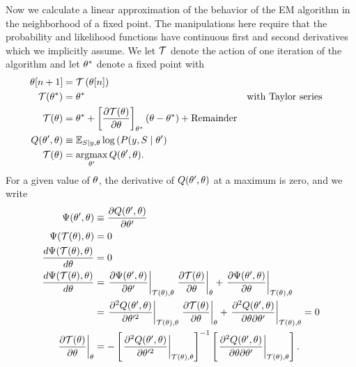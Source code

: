 \newcommand{\OldParameters}{\parameters}
\newcommand{\NewParameters}{\parameters'}
Now we calculate a linear approximation of the behavior of the EM
algorithm in the neighborhood of a fixed point.  The manipulations
here require that the probability and likelihood functions have
continuous first and second derivatives which we implicitly assume.
We let $\EMmap$ denote the action of one iteration of the algorithm and
let ${\theta^*}$ denote a fixed point with
\begin{align}
  \ti{\parameters}{n+1} &= \EMmap\left( \ti{\parameters}{n} \right) \\
  \EMmap(\EMfixedPoint) &= \EMfixedPoint && \text{with Taylor series} \\
  \EMmap(\parameters) &= \EMfixedPoint + \left[ \frac{\partial
                 \EMmap(\parameters)}{\partial \parameters} \right]_{\EMfixedPoint} (\parameters - \EMfixedPoint) + \text{Remainder} \\
  Q(\NewParameters, \OldParameters) &\equiv \EV_{S \given y,\OldParameters} \log\left(P(y,S \given
  \NewParameters \right) \\
  \EMmap(\OldParameters) &= \argmax_{\NewParameters} Q(\NewParameters, \OldParameters). 
\end{align}
For a given value of $\OldParameters$, the derivative of $Q(\NewParameters,
\OldParameters)$ at a maximum is zero, and we write
\begin{align}
  \Psi(\NewParameters,\OldParameters)
  &\equiv \frac{\partial Q(\NewParameters,
    \OldParameters)}{\partial \NewParameters} \\
  \Psi(\EMmap(\OldParameters), \OldParameters)
  &= 0 \\
  \frac{d\Psi(\EMmap(\OldParameters), \OldParameters)}{d \OldParameters}
  &= 0 \\
  \frac{d\Psi(\EMmap(\OldParameters), \OldParameters)}{d \OldParameters}
  &= \left. \frac{\partial \Psi(\NewParameters, \OldParameters)}{\partial \NewParameters}
    \right|_{\EMmap(\OldParameters), \OldParameters} \left.\frac{\partial
    \EMmap(\theta)}{\partial \theta} \right|_{\OldParameters} +
    \left. \frac{\partial \Psi(\NewParameters, \OldParameters)}{\partial \OldParameters}
    \right|_{\EMmap(\OldParameters), \OldParameters} \\
  &= \left. \frac{\partial^2 Q(\NewParameters, \OldParameters)}{\partial \NewParameters^2}
    \right|_{\EMmap(\OldParameters), \OldParameters} \left.\frac{\partial
    \EMmap(\theta)}{\partial \theta} \right|_{\OldParameters} +
    \left. \frac{\partial^2 Q(\NewParameters, \OldParameters)}{\partial \OldParameters
    \partial \NewParameters} \right|_{\EMmap(\OldParameters), \OldParameters} =0 \\
  \label{eq:two_second_derivatives}
  \left.\frac{\partial \EMmap(\theta)}{\partial \theta}
  \right|_{\OldParameters}
  &= - \left[ \left. \frac{\partial^2 Q(\NewParameters,  \OldParameters)}{\partial
    \NewParameters^2} \right|_{\EMmap(\OldParameters), \OldParameters} \right]^{-1} \left[
    \left. \frac{\partial^2 Q(\NewParameters, \OldParameters)}{\partial \OldParameters
    \partial \NewParameters} \right|_{\EMmap(\OldParameters), \OldParameters} \right].
\end{align}
